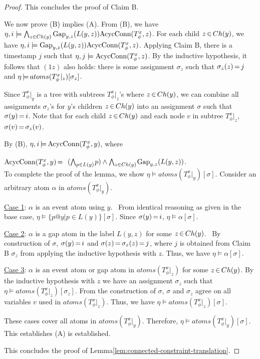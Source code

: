 \begin{proof}
This concludes the proof of Claim B.

\smallskip

We now prove (B) implies (A).
From (B), we have\\
$\eta,i\models
\bigwedge_{z\in Ch(y)} \text{Gap}_{y,z}(L(y,z))\text{AcycConn}(T_\phi^x,z)$.
For each child $z\,{\in}\, Ch(y)$,
we have
$\eta,i\models \text{Gap}_{y,z}(L(y,z))\text{AcycConn}(T_\phi^x,z)$.
Applying Claim B,
there is a timestamp $j$
such that
$\eta,j\models \text{AcycConn}(T_\phi^x,z)$.
By the inductive hypothesis,
it follows that $(1z)$ also holds:
there is some assignment $\sigma_z$
such that 
$\sigma_z(z)\,{=}\,j$
and
$\eta\,{\models}\, atoms(T_\phi^x|_z)[\sigma_z]$.

Since $T_\phi^x|_y$ is a tree with subtrees
$T_\phi^x|_z$'s where $z\,{\in}\, Ch(y)$,
we can combine all assignments $\sigma_z$'s
for $y$'s children $z\,{\in}\, Ch(y)$
into an assignment $\sigma$ such that
$\sigma(y)\,{=}\,i$.
Note that 
for each child $z\,{\in}\, Ch(y)$ and each
node $v$ in subtree $T_\phi^x|_z$,
$\sigma(v)\,{=}\,\sigma_z(v)$.

\smallskip

By (B),
$\eta,i\,{\models}\, \text{AcycConn}(T_\phi^x,y)$,
where

$\text{AcycConn}(T_\phi^x,y) \,{=}\,$
$(\bigwedge_{p\in L(y)}\hspace*{-1pt}p)
\wedge \bigwedge_{z\in Ch(y)} \hspace*{-1pt} \text{Gap}_{y,z}(L(y,z))$.\\
To complete the proof of the lemma,
we show $\eta\models atoms(T_\phi^x|_y)[\sigma]$.
Consider an arbitrary atom $\alpha$ in $atoms(T_\phi^x|_y)$.

\underline{Case 1}:
$\alpha$ is an event atom using $y$.~
From identical reasoning as given in the base case,
$\eta\models \{p@y|p\in L(y)\}[\sigma]$.
Since $\sigma(y)\,{=}\,i$,
$\eta\models\alpha[\sigma]$.

\underline{Case 2}:
$\alpha$ is a gap atom in the label $L(y,z)$
for some $z\,{\in}\, Ch(y)$.~
By construction of $\sigma$,
$\sigma(y)\,{=}\,i$ and $\sigma(z)\,{=}\,\sigma_z(z)\,{=}\,j$,
where
$j$ is obtained from Claim B
$\sigma_z$ from applying the inductive hypothesis with $z$.
Thus, we have $\eta\models\alpha[\sigma]$.

\underline{Case 3}:
$\alpha$ is an event atom or gap atom
in $atoms(T_\phi^x|_z)$ for some $z\,{\in}\, Ch(y)$.
By the inductive hypothesis with $z$
we have an assignment $\sigma_z$ such that
$\eta\models atoms(T_\phi^x|_z)[\sigma_z]$.
From the construction of $\sigma$,
$\sigma$ and $\sigma_z$ agree on all variables $v$
used in $atoms(T_\phi^x|_z)$.
Thus, we have $\eta\models atoms(T_\phi^x|_z)[\sigma]$.

These cases cover all atoms in $atoms(T_\phi^x|_y)$.
Therefore, $\eta\models atoms(T_\phi^x|_y)[\sigma]$.
This establishes (A) is established. 

This concludes the proof of Lemma\:\ref{lem:connected-constraint-translation}.
\end{proof}
  

